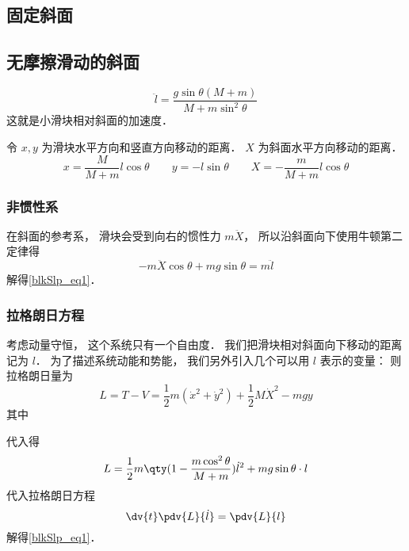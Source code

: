
\subsection{固定斜面}

\subsection{无摩擦滑动的斜面}
\begin{equation}\label{blkSlp_eq1}
\ddot l = \frac{g\sin\theta(M+m)}{M + m\sin^2\theta}
\end{equation}
这就是小滑块相对斜面的加速度．

令 $x, y$ 为滑块水平方向和竖直方向移动的距离． $X$ 为斜面水平方向移动的距离．
\begin{equation}
x = \frac{M}{M + m}l\cos\theta
\qquad
y = -l\sin\theta
\qquad
X = -\frac{m}{M + m}l\cos\theta
\end{equation}

\subsubsection{非惯性系}
在斜面的参考系， 滑块会受到向右的惯性力 $m\ddot X$， 所以沿斜面向下使用牛顿第二定律得
\begin{equation}
-m\ddot X\cos\theta + mg\sin\theta = m\ddot l
\end{equation}
解得\autoref{blkSlp_eq1}．

\subsubsection{拉格朗日方程}
考虑动量守恒， 这个系统只有一个自由度． 我们把滑块相对斜面向下移动的距离记为 $l$． 为了描述系统动能和势能， 我们另外引入几个可以用 $l$ 表示的变量：  则拉格朗日量为
\begin{equation}
L = T - V = \frac12 m(\dot x^2 + \dot y^2) + \frac12 M \dot X^2 - mgy
\end{equation}
其中

代入得
\begin{equation}
L = \frac{1}{2}m \qty(1 - \frac{m\cos^2\theta}{M + m}) \dot l^2 + mg\sin\theta \cdot l
\end{equation}
代入拉格朗日方程
\begin{equation}
\dv{t} \pdv{L}{\dot l} = \pdv{L}{l}
\end{equation}
解得\autoref{blkSlp_eq1}．
